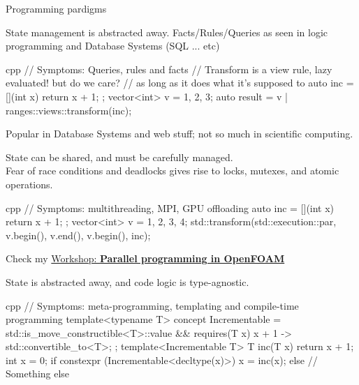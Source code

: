 \begin{frame}{Programming pardigms}
\begin{description}
        State management is abstracted away. Facts/Rules/Queries as seen in logic
        programming and Database Systems (SQL ... etc)
\begin{CodeEnvNoComment}{cpp}{\scriptsize}
// Symptoms: Queries, rules and facts
// Transform is a view rule, lazy evaluated! but do we care?
// as long as it does what it's supposed to
auto inc = [](int x) { return x + 1; };
vector<int> v = {1, 2, 3};
auto result = v | ranges::views::transform(inc);
\end{CodeEnvNoComment}
        Popular in Database Systems and web stuff; not so much in scientific computing.
    \item[Parallel Programming\hspace{2cm}] \hspace{\linewidth} 
        State can be shared, and must be carefully managed.\\
        Fear of race conditions and deadlocks gives rise to locks, mutexes, and atomic operations.\\
\begin{CodeEnvNoComment}{cpp}{\scriptsize}
// Symptoms: multithreading, MPI, GPU offloading
auto inc = [](int x) { return x + 1; };
vector<int> v = {1, 2, 3, 4};
std::transform(std::execution::par, v.begin(), v.end(), v.begin(), inc);
\end{CodeEnvNoComment}
        Check my \href{https://openfoam-parallelisation-course.github.io/}{Workshop: \bf Parallel programming in OpenFOAM}
    \item[Generic Programming\hspace{2cm}] \hspace{\linewidth} 
        State is abstracted away, and code logic is type-agnostic.
\begin{CodeEnvNoComment}{cpp}{\scriptsize}
// Symptoms: meta-programming, templating and compile-time programming
template<typename T>
concept Incrementable = std::is_move_constructible<T>::value
    && requires(T x) { { x + 1 } -> std::convertible_to<T>; };
template<Incrementable T> T inc(T x) { return x + 1; }
int x = 0;
if constexpr (Incrementable<decltype(x)>) {
    x = inc(x);
} else {
    // Something else
}
\end{CodeEnvNoComment}
\end{description}

\end{frame}
